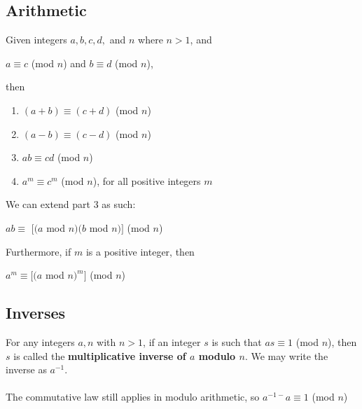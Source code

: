 \documentclass[a4paper]{article}
\begin{document}
\subsection{Arithmetic}
Given integers $a, b, c, d,$ and $n$ where $n>1$, and
\begin{center}
	$a \equiv c$ (mod $n$) and $b \equiv d$ (mod $n$),
\end{center}
then
\begin{enumerate}
	\item $(a+b) \equiv (c+d)$ (mod $n$)
	\item $(a-b) \equiv (c-d)$ (mod $n$)
	\item $ab\equiv cd$ (mod $n$)
	\item $a^m \equiv c^m$ (mod $n$), for all positive integers $m$
\end{enumerate}
We can extend part 3 as such:\\
\begin{center}
	$ab \equiv$ $[(a$ mod $n)(b$ mod $n)]$ (mod $n$)
\end{center}
Furthermore, if $m$ is a positive integer, then
\begin{center}
	$a^m \equiv [(a$ mod $n)^m]$ (mod $n$)
\end{center}
\subsection{Inverses}
For any integers $a, n$ with $n>1$, if an integer $s$ is such that $as \equiv 1$ (mod $n$), then $s$ is called the \textbf{multiplicative inverse of $a$ modulo $n$}. We may write the inverse as $a^{-1}$.\\ \\
The commutative law still applies in modulo arithmetic, so $a^{-1-}a \equiv 1$ (mod $n$)

\newpage
\appendix
\end{document}
